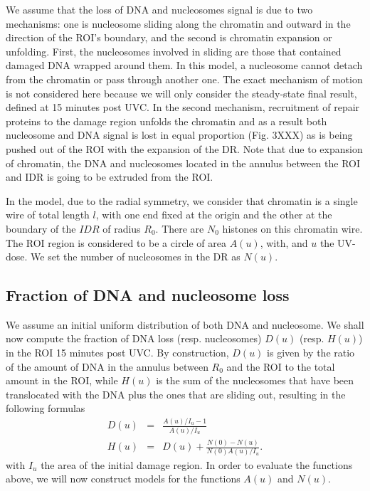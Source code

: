 \documentclass[12pt]{article}
\begin{document}
We assume that the loss of DNA and nucleosomes signal is due to two mechanisms: one is nucleosome sliding along the chromatin and outward in the direction of the ROI's boundary, and the second is chromatin expansion or unfolding. First, the nucleosomes involved in sliding are those that contained damaged DNA wrapped around them. In this model, a nucleosome cannot detach from the chromatin or pass through another one. The exact mechanism of motion is not considered here because we will only consider the steady-state final result, defined at 15 minutes post UVC. In the second mechanism, recruitment of repair proteins to the damage region unfolds the chromatin and as a result  both nucleosome and DNA signal is lost in equal proportion (Fig. 3XXX) as is being pushed out of the ROI with the expansion of the DR. Note that due to expansion of chromatin, the DNA and nucleosomes located in the annulus between the ROI and IDR is going to be extruded from the ROI.

In the model, due to the radial symmetry, we consider that chromatin is a single wire of total length $l$, with one end fixed at the origin and the other at the boundary of the $IDR$ of radius $R_0$. There are $N_0$ histones on this chromatin wire.  The ROI region is considered to be a circle of area $A(u)$, with, and $u$ the UV-dose. We set the number of nucleosomes in the DR as $N(u)$.

\subsection{Fraction of DNA and nucleosome loss }\label{subsection:fractionOfDNAandNucleosomeLoss}
We assume an initial uniform distribution of both DNA and nucleosome. 
We shall now compute the fraction of DNA loss (resp. nucleosomes) $D(u)$ (resp. $H(u)$) in the ROI 15 minutes post UVC. By construction, $D(u)$ is given by the ratio of the amount of DNA in the annulus between $R_0$ and the ROI to the total amount in the ROI, while $H(u)$ is the sum of the nucleosomes that have been translocated with the DNA plus the ones that are sliding out, resulting in the following formulas
\begin{eqnarray*}
D(u)&=& \frac{A(u)/I_u -1}{A(u)/I_u} \\
H(u)&=&D(u)+\frac{N(0)-N(u)}{N(0)A(u)/I_u}.
\end{eqnarray*}
with $I_u$ the area of the initial damage region.
In order to evaluate the functions above, we will now construct models for the functions $A(u)$ and $N(u)$.
\end{document}
